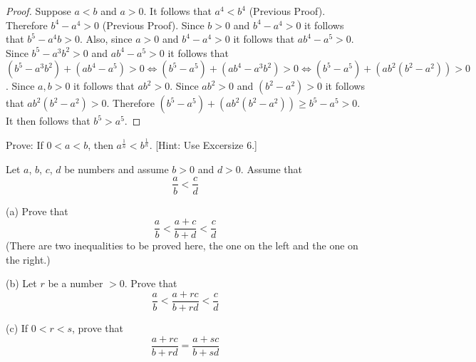 \documentclass[6pt]{article}
\begin{document}
\begin{proof}
    Suppose $a < b$ and $a > 0$. It follows that $a^4 < b^4$ (Previous Proof).  
    Therefore $b^4 - a^4 > 0$ (Previous Proof).  
    Since $b > 0$ and $b^4 - a^4 > 0$ it follows that $b^5 - a^4b > 0$.  
    Also, since $a > 0$ and $b^4 - a^4 > 0$ it follows that $ab^4 - a^5 > 0$.  
    Since $b^5 - a^3b^2 > 0$ and $ab^4 - a^5 > 0$ it follows that  
        $(b^5 - a^3b^2) + (ab^4 - a^5) > 0  
        \iff (b^5 - a^5) + (ab^4 - a^3b^2) > 0  
        \iff (b^5 - a^5) + (ab^2(b^2 - a^2)) > 0$.  
    Since $a, b > 0$ it follows that $ab^2 > 0$.  
    Since $ab^2 > 0$ and $(b^2 - a^2) > 0$ it follows that $ab^2(b^2 - a^2) > 0$.  
    Therefore $(b^5 - a^5) + (ab^2(b^2 - a^2)) \ge b^5 - a^5 > 0$.  
    It then follows that $b^5 > a^5$.
\end{proof}

\begin{tcolorbox}[title=Problem 7, breakable]
    Prove: If $0 < a < b$, then $a^{\frac{1}{n}} < b^{\frac{1}{n}}$. [Hint: Use Excersize $6$.]
\end{tcolorbox}

\begin{tcolorbox}[title=Problem 8, breakable]
    Let $a$, $b$, $c$, $d$ be numbers and assume $b > 0$ and $d > 0$. Assume that 
    \[\frac{a}{b} < \frac{c}{d}\]
    
    (a) Prove that 
    \[\frac{a}{b} < \frac{a + c}{b + d} < \frac{c}{d}\]
    (There are two inequalities to be proved here, the one on the left 
    and the one on the right.)

    (b) Let $r$ be a number $> 0$. Prove that \
    \[\frac{a}{b} < \frac{a + rc}{b + rd} < \frac{c}{d}\]
    
    (c) If $0 < r < s$, prove that 
    \[\frac{a + rc}{b + rd} = \frac{a + sc}{b + sd}\]
\end{tcolorbox}
\end{document}
